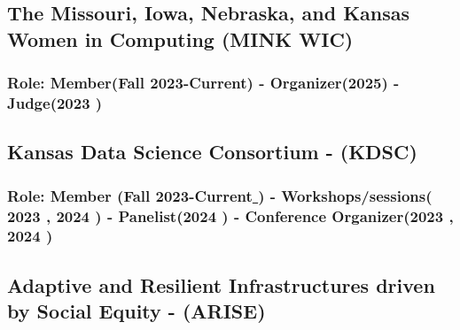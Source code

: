 \documentclass[11pt]{article}
\begin{document}
\subsection{The Missouri, Iowa, Nebraska, and Kansas Women in Computing (MINK WIC) \hfill  \normalfont    }
\subsubsection{\normalfont Role: Member(Fall 2023-Current) - Organizer(2025) - Judge(2023 {\href{https://www.linkedin.com/posts/safiamalallah_minkwic23-activity-7124098645448151040-Bcgf?utm_source=share&utm_medium=member_desktop}{\color{icnclr} \faGlobe[regular]}})}
\vspace{0.5em} %




\subsection{Kansas Data Science Consortium - (KDSC) \hfill    }
\subsubsection{\normalfont Role: Member
(Fall 2023-Current{\href{https://nsfepscor.ku.edu/2023/09/30/data-science-hub-benefits-students-and-organizations-in-kansas/}{\color{icnclr} \faGlobe[regular] }}) - Workshops/sessions( 2023 {\href{https://nsfepscor.ku.edu/2023/05/23/data-science-on-display/}{\color{icnclr} \faGlobe[regular]}}, 2024 {\href{https://data.ku.edu/kdscon2024}{\color{icnclr} \faGlobe[regular] }}) - Panelist(2024 {\href{https://www.linkedin.com/posts/safiamalallah_kansasdatascience-datascienceeducation-womenindatascience-activity-7190988975367417857-htmg?utm_source=share&utm_medium=member_desktop}{\color{icnclr} \faGlobe[regular]}}) - Conference Organizer(2023 {\href{https://www.linkedin.com/posts/safiamalallah_our-esteemed-team-comprising-members-from-activity-7059951265413279744-z3gf?utm_source=share&utm_medium=member_desktop}{\color{icnclr} \faGlobe[regular]}}, 2024 {\href{https://data.ku.edu/kdscon2024}{\color{icnclr} \faGlobe[regular]}})
}


\vspace{0.5em} %



\subsection{Adaptive and Resilient Infrastructures driven by Social Equity - (ARISE) \hfill    }
\end{document}

